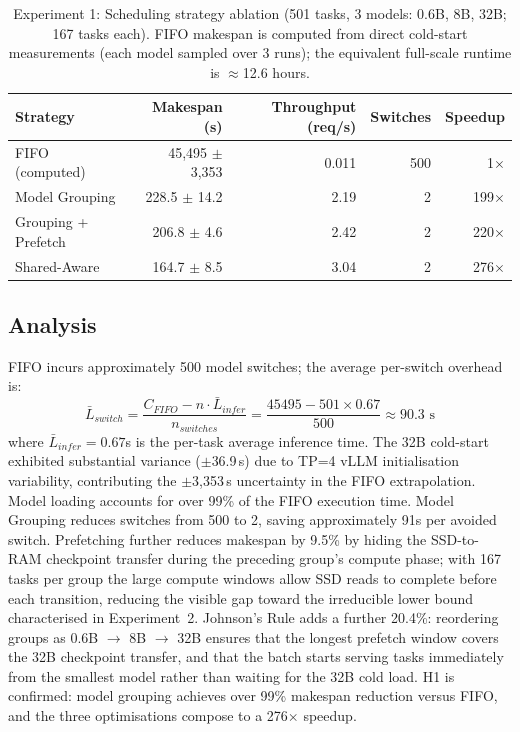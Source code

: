 \documentclass[logo,bsc,singlespacing,parskip,online]{infthesis}
\begin{document}
\begin{table}[htbp]
\centering
\caption{Experiment 1: Scheduling strategy ablation (501 tasks, 3 models: 0.6B, 8B, 32B; 167 tasks each). FIFO makespan is computed from direct cold-start measurements (each model sampled over 3 runs); the equivalent full-scale runtime is $\approx$12.6 hours.}
\label{tab:exp1_results}
\begin{tabular}{lrrrr}
\toprule
Strategy & Makespan (s) & Throughput (req/s) & Switches & Speedup \\
\midrule
FIFO (computed) & 45,495 $\pm$ 3,353 & 0.011 & 500 & 1$\times$ \\
Model Grouping & 228.5 $\pm$ 14.2 & 2.19 & 2 & 199$\times$ \\
Grouping + Prefetch & 206.8 $\pm$ 4.6 & 2.42 & 2 & 220$\times$ \\
Shared-Aware & 164.7 $\pm$ 8.5 & 3.04 & 2 & 276$\times$ \\
\bottomrule
\end{tabular}
\end{table}

\subsection{Analysis}

FIFO incurs approximately 500 model switches; the average per-switch overhead is:
$$\bar{L}_{switch} = \frac{C_{FIFO} - n \cdot \bar{L}_{infer}}{n_{switches}} = \frac{45495 - 501 \times 0.67}{500} \approx 90.3 \text{ s}$$
where $\bar{L}_{infer} = 0.67$s is the per-task average inference time. The 32B cold-start exhibited substantial variance ($\pm$36.9\,s) due to TP=4 vLLM initialisation variability, contributing the $\pm$3{,}353\,s uncertainty in the FIFO extrapolation. Model loading accounts for over 99\% of the FIFO execution time. Model Grouping reduces switches from 500 to 2, saving approximately 91s per avoided switch. Prefetching further reduces makespan by 9.5\% by hiding the SSD-to-RAM checkpoint transfer during the preceding group's compute phase; with 167 tasks per group the large compute windows allow SSD reads to complete before each transition, reducing the visible gap toward the irreducible lower bound characterised in Experiment~2. Johnson's Rule adds a further 20.4\%: reordering groups as 0.6B $\to$ 8B $\to$ 32B ensures that the longest prefetch window covers the 32B checkpoint transfer, and that the batch starts serving tasks immediately from the smallest model rather than waiting for the 32B cold load. H1 is confirmed: model grouping achieves over 99\% makespan reduction versus FIFO, and the three optimisations compose to a 276$\times$ speedup.
\end{document}
